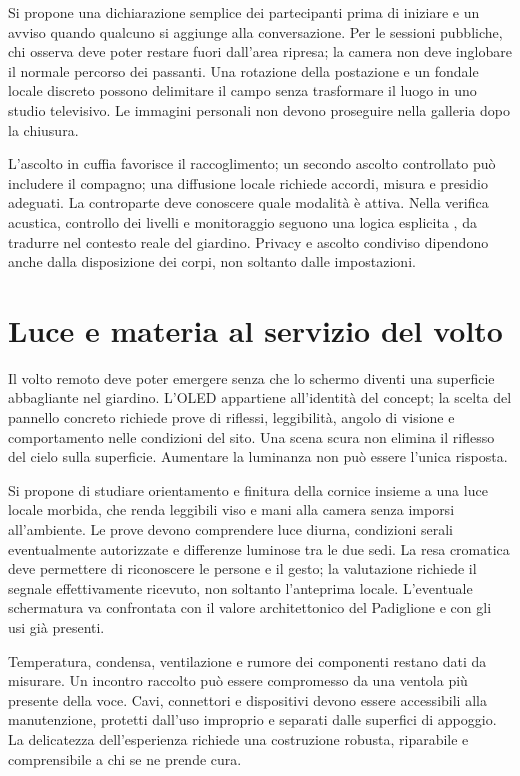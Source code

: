 Si propone una dichiarazione semplice dei partecipanti prima di iniziare
e un avviso quando qualcuno si aggiunge alla conversazione. Per le
sessioni pubbliche, chi osserva deve poter restare fuori dall'area ripresa;
la camera non deve inglobare il normale percorso dei passanti. Una
rotazione della postazione e un fondale locale discreto possono delimitare
il campo senza trasformare il luogo in uno studio televisivo. Le immagini
personali non devono proseguire nella galleria dopo la chiusura.

L'ascolto in cuffia favorisce il raccoglimento; un secondo ascolto
controllato può includere il compagno; una diffusione locale richiede
accordi, misura e presidio adeguati. La controparte deve conoscere quale
modalità è attiva. Nella verifica acustica, controllo dei livelli e
monitoraggio seguono una logica esplicita \cite{des_who2022}, da tradurre
nel contesto reale del giardino. Privacy e ascolto condiviso dipendono
anche dalla disposizione dei corpi, non soltanto dalle impostazioni.

\section{Luce e materia al servizio del volto}

Il volto remoto deve poter emergere senza che lo schermo diventi una
superficie abbagliante nel giardino. L'OLED appartiene all'identità del
concept; la scelta del pannello concreto richiede prove di riflessi,
leggibilità, angolo di visione e comportamento nelle condizioni del sito.
Una scena scura non elimina il riflesso del cielo sulla superficie.
Aumentare la luminanza non può essere l'unica risposta.

Si propone di studiare orientamento e finitura della cornice insieme a
una luce locale morbida, che renda leggibili viso e mani alla camera senza
imporsi all'ambiente. Le prove devono comprendere luce diurna, condizioni
serali eventualmente autorizzate e differenze luminose tra le due sedi.
La resa cromatica deve permettere di riconoscere le persone e il gesto;
la valutazione richiede il segnale effettivamente ricevuto, non soltanto
l'anteprima locale. L'eventuale schermatura va confrontata con il valore
architettonico del Padiglione e con gli usi già presenti.

Temperatura, condensa, ventilazione e rumore dei componenti restano dati
da misurare. Un incontro raccolto può essere compromesso da una ventola
più presente della voce. Cavi, connettori e dispositivi devono essere
accessibili alla manutenzione, protetti dall'uso improprio e separati
dalle superfici di appoggio. La delicatezza dell'esperienza richiede una
costruzione robusta, riparabile e comprensibile a chi se ne prende cura.

